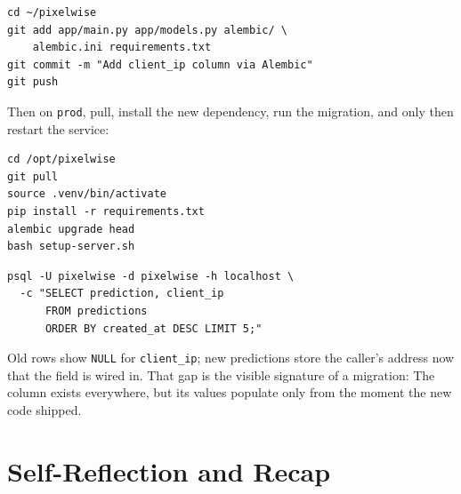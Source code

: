 \begin{verbatim}
cd ~/pixelwise
git add app/main.py app/models.py alembic/ \
    alembic.ini requirements.txt
git commit -m "Add client_ip column via Alembic"
git push
\end{verbatim}

Then on \texttt{prod}, pull, install the new dependency, run the
migration, and only then restart the service:

\begin{verbatim}
cd /opt/pixelwise
git pull
source .venv/bin/activate
pip install -r requirements.txt
alembic upgrade head
bash setup-server.sh
\end{verbatim}


\begin{verbatim}
psql -U pixelwise -d pixelwise -h localhost \
  -c "SELECT prediction, client_ip
      FROM predictions
      ORDER BY created_at DESC LIMIT 5;"
\end{verbatim}

Old rows show \texttt{NULL} for \texttt{client\_ip}; new predictions
store the caller's address now that the field is wired in. That gap is
the visible signature of a migration: The column exists everywhere, but
its values populate only from the moment the new code shipped.


\newpage
\section{Self-Reflection and Recap}


